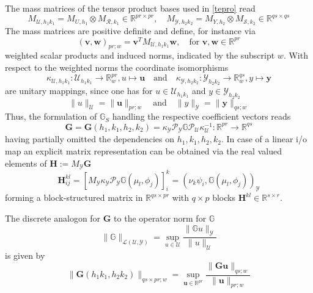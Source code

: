 \documentclass[a4paper,10pt,BCOR=15mm]{scrbook}
\providecommand{\norm}[1]{\lVert#1 \rVert}
\begin{document}
The mass matrices of the tensor product bases used in \eqref{tepro} read
\begin{equation*}
 M_{\mathcal U, h_1k_1} = M_{U,h_1} \otimes M_{\mathcal R,k_1} \in \mathbb R ^{pr \times pr }, \quad  M_{\mathcal Y, h_2k_2} = M_{Y,h_2} \otimes M_{\mathcal S,k_2} \in
 \mathbb R ^{qs \times qs }
\end{equation*}
The mass matrices are positive definite and define, for instance via 
\begin{equation*}
 (\mathbf{v,w})_{pr;w} = \mathbf v ^T M_{\mathcal U, h_1k_1} \mathbf w, \quad \text{for   } \mathbf{v,w} \in \mathbb R ^{pr}
\end{equation*}
weighted scalar products and induced norms, indicated by the subscript $w$. With respect to the weighted norms the coordinate isomorphisms 
\begin{equation*}
 \kappa_{\mathcal U,h_1k_1}: \mathcal U_{h_1k_1} \rightarrow \mathbb R ^{pr} _w, u \mapsto \mathbf u \quad  \text{and} \quad \kappa_{\mathcal Y,h_2k_2}: \mathcal Y_{h_2k_2} \rightarrow \mathbb R ^{qs} _w, y \mapsto \mathbf y
\end{equation*}
are unitary mappings, since one has for $u\in \mathcal U_{h_1k_1}$ and $y \in \mathcal Y_{h_2k_2}$ 
\begin{equation*}
 \norm{u}_{\mathcal U} = \norm{\mathbf u}_{pr;w} \quad \text{and}  \quad \norm{y}_{\mathcal Y} = \norm{\mathbf y}_{qs;w}
\end{equation*}
Thus, the formulation of $\mathbb G _S$ handling the respective coefficient vectors reads
\begin{equation*}
 \mathbf G = \mathbf G(h_1,k_1,h_2,k_2) = \kappa _{\mathcal Y} \mathscr P _{\mathcal Y} \mathbb G \mathscr P _{\mathcal U} \kappa _{\mathcal U}^{-1} : \mathbb R ^{pr} \rightarrow \mathbb R ^{qs}
\end{equation*}
having partially omitted the dependencies on $h_1,k_1,h_2,k_2$. In case of a linear i/o map an explicit matrix representation can be obtained via the real valued elements of $ \mathbf H := M_{\mathcal Y } \mathbf G$
\begin{equation*}
\mathbf H_{ij}^{kl} = \left[ M_{\mathcal Y } \kappa _{\mathcal Y} \mathscr P _{\mathcal Y} \mathbb G(\mu_l,\phi_j) \right]_i^k = (\nu_k \psi_i,\mathbb G(\mu_l,\phi_j))_{\mathcal Y}
\end{equation*}
forming a block-structured matrix in $\mathbb R ^{ qs\times pr}$ with $q \times p$ blocks $\mathbf H ^ {kl} \in \mathbb R ^{s\times r}$. 

The discrete analogon for $\mathbf G$ to the operator norm for $\mathbb G$
\begin{equation*}
 \norm{ \mathbb G}_{\mathscr L({\mathcal U,\mathcal Y})} = \sup_{u\in \mathcal U} \frac{\norm{\mathbb G u}_{\mathcal Y}}{\norm{u}_{\mathcal U}}
\end{equation*}
is given by
\begin{equation*}
  \norm{ \mathbf G(h_1k_1,h_2k_2)}_{qs \times pr ; w} = \sup_{\mathbf u\in \mathbb R^{pr}} \frac{\norm{\mathbf G \mathbf u}_{qs;w}}{\norm{\mathbf u}_{pr;w}}
\end{equation*}
\end{document}
